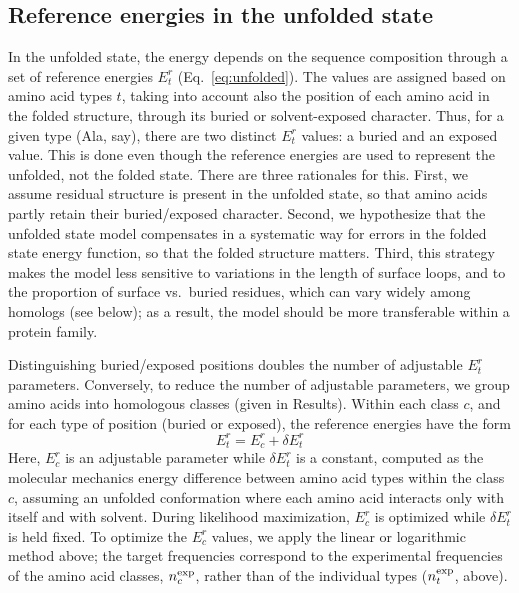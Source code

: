 \documentclass[12pt]{article}
\begin{document}
\subsection{Reference energies in the unfolded state}
In the unfolded state, the energy depends on the sequence composition through a set of reference energies $E^r_t$
(Eq.\ \ref{eq:unfolded}). The values are assigned based on amino acid types $t$, taking into account also the position
of each amino acid in the folded structure, through its buried or solvent-exposed character. Thus, for a given type
(Ala, say), there are two distinct $E^r_t$ values: a buried and an exposed value. This is done even though the reference
energies are used to represent the unfolded, not the folded state. There are three rationales for this. First, we assume
residual structure is present in the unfolded state, so that amino acids partly retain their buried/exposed character.
Second, we hypothesize that the unfolded state model compensates in a systematic way for errors in the folded state energy
function, so that the folded structure matters. Third, this strategy makes the model less sensitive to variations in
the length of surface loops, and to the proportion of surface vs.\ buried residues, which can vary widely among homologs
(see below); as a result, the model should be more transferable within a protein family.

Distinguishing buried/exposed positions doubles the number of adjustable $E^r_t$ parameters. Conversely, to reduce the
number of adjustable parameters, we group amino acids into homologous classes (given in Results). Within each class
$c$, and for each type of position (buried or exposed), the reference energies have the form
\begin{equation}
E^r_t = E^r_c + \delta E^r_t
\end{equation}
Here, $E^r_c$ is an adjustable parameter while $\delta E^r_t$ is a constant, computed as the molecular mechanics energy
difference between amino acid types within the class $c$, assuming an unfolded conformation where each amino acid interacts
only with itself and with solvent. During likelihood maximization, $E^r_c$ is optimized while $\delta E^r_t$ is held fixed.
To optimize the $E^r_c$ values, we apply the linear or logarithmic method above; the target frequencies correspond to the
experimental frequencies of the amino acid classes, $n_c^{\rm exp}$, rather than of the individual types ($n_t^{\rm exp}$, above).
\end{document}
